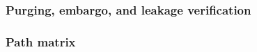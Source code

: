 \documentclass[12pt,a4paper,oneside]{article}
\begin{document}
\subsubsection{Purging, embargo, and leakage verification}\label{subsubsec:purging_embargo_leakage}

%
%
%
%
%
%
%
%
%
%
%


\subsubsection{Path matrix}\label{subsubsec:path_matrix}

%
%
\end{document}
